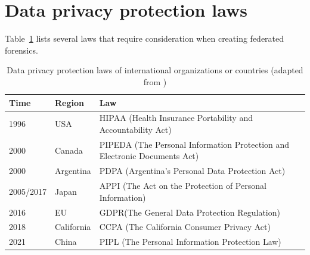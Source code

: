 
\section{Data privacy protection laws}
Table~\ref{tab:privacy_laws} lists several laws that require consideration when creating federated forensics. 

\begin{table}[ht]
\centering
\footnotesize
\caption{Data privacy protection laws of international organizations or countries (adapted from \citep{LI2023271})}
\label{tab:privacy_laws} 
\begin{tabular}{p{.9cm}p{1cm}p{5cm}}
\toprule
\textbf{Time} & \textbf{Region} & \textbf{Law}  \\
\midrule
1996 & USA & HIPAA (Health Insurance Portability and Accountability Act)  \\

2000 & Canada & PIPEDA (The Personal Information Protection and \newline Electronic Documents Act)   \\

2000 & Argentina & PDPA (Argentina's Personal Data Protection Act)   \\

2005/2017 & Japan & APPI (The Act on the Protection of Personal Information)   \\

2016 & EU & GDPR(The General Data Protection Regulation)   \\

2018 & California & CCPA (The California Consumer Privacy Act)   \\

2021 & China & PIPL (The Personal Information Protection Law)   \\
\bottomrule
\end{tabular}
\end{table}

